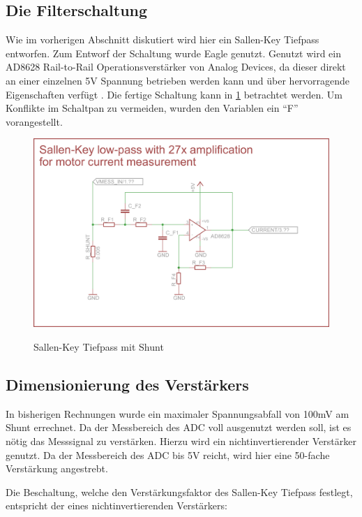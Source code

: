 
\subsection{Die Filterschaltung}

Wie im vorherigen Abschnitt diskutiert wird hier ein Sallen-Key Tiefpass entworfen. Zum Entworf der Schaltung wurde Eagle genutzt.
Genutzt wird ein AD8628  Rail-to-Rail Operationsverstärker von Analog Devices, da dieser direkt an einer einzelnen 5V Spannung betrieben werden kann und
über hervorragende Eigenschaften verfügt \cite{ds-opv}. Die fertige Schaltung kann in \cref{fig:fschalt} betrachtet werden. Um Konflikte im Schaltpan zu vermeiden,
wurden den Variablen ein ``F'' vorangestellt.
\begin{figure}[H]
\centering
\includegraphics[width=.8\textwidth]{filter_schaltung.png}\\
\caption{Sallen-Key Tiefpass mit Shunt}%
\label{fig:fschalt}
\end{figure}



\subsection{Dimensionierung des Verstärkers}

In bisherigen Rechnungen wurde ein maximaler Spannungsabfall von 100mV am Shunt errechnet. Da der Messbereich des ADC voll ausgenutzt werden soll,
ist es nötig das Messsignal zu verstärken. Hierzu wird ein nichtinvertierender Verstärker genutzt. Da der Messbereich des ADC bis 5V reicht, wird hier eine 
50-fache Verstärkung angestrebt.

Die Beschaltung, welche den Verstärkungsfaktor des Sallen-Key Tiefpass festlegt, entspricht der eines nichtinvertierenden Verstärkers:

